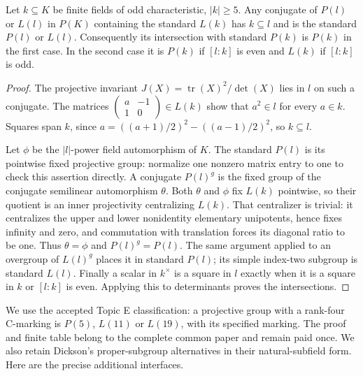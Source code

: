 \begin{lemma}\label{E.SubfieldEnvelope}
Let $k\subseteq K$ be finite fields of odd characteristic, $|k|\ge5$.
Any conjugate of $P(l)$ or $L(l)$ in $P(K)$ containing the standard
$L(k)$ has $k\subseteq l$ and is the standard $P(l)$ or $L(l)$.
Consequently its intersection with standard $P(k)$ is $P(k)$ in the
first case. In the second case it is $P(k)$ if $[l:k]$ is even and
$L(k)$ if $[l:k]$ is odd.
\end{lemma}
\begin{proof}
The projective invariant $J(X)=\operatorname{tr}(X)^2/\det(X)$ lies
in $l$ on such a conjugate. The matrices
$\left(\begin{smallmatrix}a&-1\\1&0\end{smallmatrix}\right)\in L(k)$
show that $a^2\in l$ for every $a\in k$. Squares span $k$, since
$a=((a+1)/2)^2-((a-1)/2)^2$, so $k\subseteq l$.

Let $\phi$ be the $|l|$-power field automorphism of $K$.
The standard $P(l)$ is its pointwise fixed projective group: normalize
one nonzero matrix entry to one to check this assertion directly.
A conjugate $P(l)^g$ is the fixed group of the conjugate semilinear
automorphism $\theta$. Both $\theta$ and $\phi$ fix $L(k)$ pointwise,
so their quotient is an inner projectivity centralizing $L(k)$.
That centralizer is trivial: it centralizes the upper and lower
nonidentity elementary unipotents, hence fixes infinity and zero,
and commutation with translation forces its diagonal ratio to be one.
Thus $\theta=\phi$ and $P(l)^g=P(l)$. The same argument applied to
an overgroup of $L(l)^g$ places it in standard $P(l)$; its simple
index-two subgroup is standard $L(l)$. Finally a scalar in $k^\times$
is a square in $l$ exactly when it is a square in $k$ or $[l:k]$ is
even. Applying this to determinants proves the intersections.
\end{proof}

We use the accepted Topic E classification: a projective group with a
rank-four C-marking is $P(5)$, $L(11)$ or $L(19)$, with its specified
marking. The proof and finite table belong to the complete common paper
and remain paid once. We also retain Dickson's proper-subgroup alternatives
in their natural-subfield form. Here are the precise additional interfaces.

